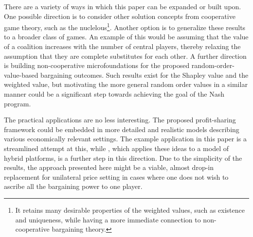 There are a variety of ways in which this paper can be expanded or built upon.
One possible direction is to consider other solution concepts from cooperative game theory, such as the nuclelous\footnote{
    It retains many desirable properties of the weighted values, such as existence and uniqueness, while having a more immediate connection to non-cooperative bargaining theory.
}.
Another option is to generalize these results to a broader class of games.
An example of this would be assuming that the value of a coalition increases with the number of central players, thereby relaxing the assumption that they are complete substitutes for each other.
A further direction is building non-cooperative microfoundations for the proposed random-order-value-based bargaining outcomes.
Such results exist for the Shapley value and the weighted value, but motivating the more general random order values in a similar manner could be a significant step towards achieving the goal of the Nash program.

The practical applications are no less interesting.
The proposed profit-sharing framework could be embedded in more detailed and realistic models describing various economically relevant settings.
The example application in this paper is a streamlined attempt at this, while \applicationref{}, which applies these ideas to a model of hybrid platforms, is a further step in this direction.
Due to the simplicity of the results, the approach presented here might be a viable, almost drop-in replacement for unilateral price setting in cases where one does not wish to ascribe all the bargaining power to one player.
